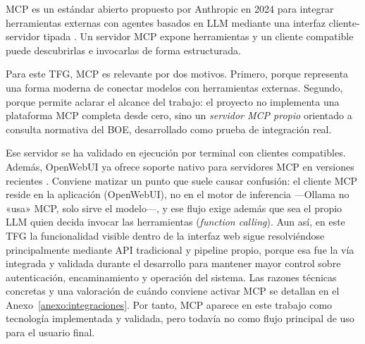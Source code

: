 MCP es un estándar abierto propuesto por Anthropic en 2024 para integrar herramientas externas con agentes basados en LLM mediante una interfaz cliente-servidor tipada \cite{anthropicMcpAnnouncement}. Un servidor MCP expone herramientas y un cliente compatible puede descubrirlas e invocarlas de forma estructurada.

Para este TFG, MCP es relevante por dos motivos. Primero, porque representa una forma moderna de conectar modelos con herramientas externas. Segundo, porque permite aclarar el alcance del trabajo: el proyecto no implementa una plataforma MCP completa desde cero, sino un \textit{servidor MCP propio} orientado a consulta normativa del BOE, desarrollado como prueba de integración real.

Ese servidor se ha validado en ejecución por terminal con clientes compatibles. Además, OpenWebUI ya ofrece soporte nativo para servidores MCP en versiones recientes \cite{openwebuiMcp2026}. Conviene matizar un punto que suele causar confusión: el cliente MCP reside en la aplicación (OpenWebUI), no en el motor de inferencia ---Ollama no «usa» MCP, solo sirve el modelo---, y ese flujo exige además que sea el propio LLM quien decida invocar las herramientas (\textit{function calling}). Aun así, en este TFG la funcionalidad visible dentro de la interfaz web sigue resolviéndose principalmente mediante API tradicional y pipeline propio, porque esa fue la vía integrada y validada durante el desarrollo para mantener mayor control sobre autenticación, encaminamiento y operación del sistema. Las razones técnicas concretas y una valoración de cuándo conviene activar MCP se detallan en el Anexo~\ref{anexo:integraciones}. Por tanto, MCP aparece en este trabajo como tecnología implementada y validada, pero todavía no como flujo principal de uso para el usuario final.
